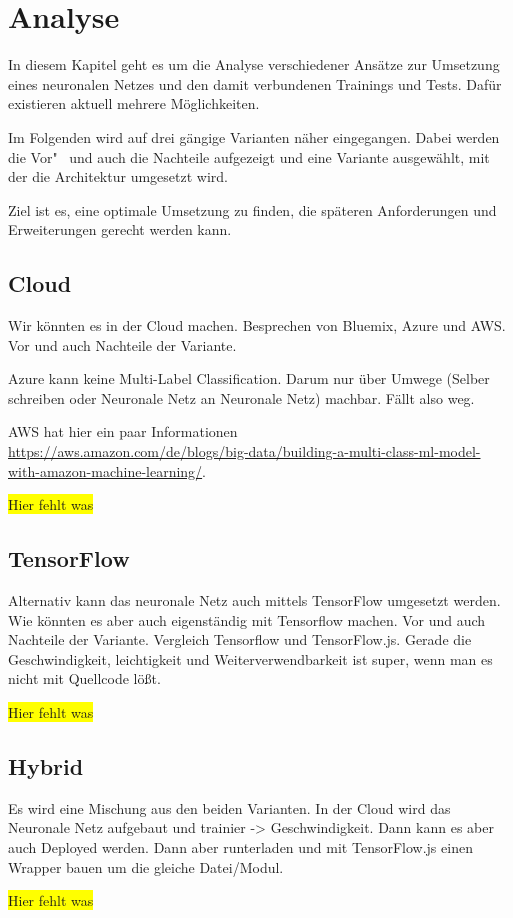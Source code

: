 \section{Analyse}
\label{sec:analyse}
In diesem Kapitel geht es um die Analyse verschiedener Ansätze zur Umsetzung eines neuronalen Netzes und den damit
verbundenen Trainings und Tests. Dafür existieren aktuell mehrere Möglichkeiten.

Im Folgenden wird auf drei gängige Varianten näher eingegangen. Dabei werden die Vor"~ und auch die Nachteile aufgezeigt
und eine Variante ausgewählt, mit der die Architektur umgesetzt wird.

Ziel ist es, eine optimale Umsetzung zu finden, die späteren Anforderungen und Erweiterungen gerecht werden kann.

\subsection{Cloud}
Wir könnten es in der Cloud machen. Besprechen von Bluemix, Azure und AWS. Vor und auch Nachteile der Variante.

Azure kann keine Multi-Label Classification. Darum nur über Umwege (Selber schreiben oder Neuronale Netz an Neuronale
Netz) machbar. Fällt also weg.

AWS hat hier ein paar Informationen\\
\url{https://aws.amazon.com/de/blogs/big-data/building-a-multi-class-ml-model-with-amazon-machine-learning/}.

\colorbox{yellow}{Hier fehlt was}

\subsection{TensorFlow}
Alternativ kann das neuronale Netz auch mittels TensorFlow umgesetzt werden.
Wie könnten es aber auch eigenständig mit Tensorflow machen. Vor und auch Nachteile der Variante. Vergleich Tensorflow
und TensorFlow.js. Gerade die Geschwindigkeit, leichtigkeit und Weiterverwendbarkeit ist super, wenn man es nicht mit
Quellcode lößt.

\colorbox{yellow}{Hier fehlt was}

\subsection{Hybrid}
Es wird eine Mischung aus den beiden Varianten. In der Cloud wird das Neuronale Netz aufgebaut und trainier -> Geschwindigkeit.
Dann kann es aber auch Deployed werden. Dann aber runterladen und mit TensorFlow.js einen Wrapper bauen um die gleiche
Datei/Modul.

\colorbox{yellow}{Hier fehlt was}